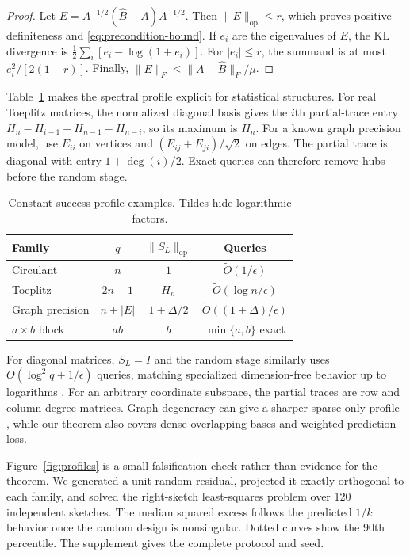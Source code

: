 \documentclass[twoside]{article}
\newcommand{\op}{\mathrm{op}}
\begin{document}
\begin{proof}
Let $E=A^{-1/2}(\widehat B-A)A^{-1/2}$. Then $\|E\|_\op\le r$, which proves positive definiteness and \eqref{eq:precondition-bound}. If $e_i$ are the eigenvalues of $E$, the KL divergence is $\frac12\sum_i[e_i-\log(1+e_i)]$. For $|e_i|\le r$, the summand is at most $e_i^2/[2(1-r)]$. Finally, $\|E\|_F\le\|A-\widehat B\|_F/\mu$.
\end{proof}

Table~\ref{tab:profiles} makes the spectral profile explicit for statistical structures. For real Toeplitz matrices, the normalized diagonal basis gives the $i$th partial-trace entry $H_n-H_{i-1}+H_{n-1}-H_{n-i}$, so its maximum is $H_n$. For a known graph precision model, use $E_{ii}$ on vertices and $(E_{ij}+E_{ji})/\sqrt2$ on edges. The partial trace is diagonal with entry $1+\deg(i)/2$. Exact queries can therefore remove hubs before the random stage.

\begin{table}[t]
\centering
\caption{Constant-success profile examples. Tildes hide logarithmic factors.}
\label{tab:profiles}
\small
\begin{tabular}{lccc}
\toprule
Family & $q$ & $\|S_L\|_\op$ & Queries \\
\midrule
Circulant & $n$ & $1$ & $\widetilde O(1/\epsilon)$ \\
Toeplitz & $2n-1$ & $H_n$ & $\widetilde O(\log n/\epsilon)$ \\
Graph precision & $n+|E|$ & $1+\Delta/2$ & $\widetilde O((1+\Delta)/\epsilon)$ \\
$a\times b$ block & $ab$ & $b$ & $\min\{a,b\}$ exact \\
\bottomrule
\end{tabular}
\end{table}

For diagonal matrices, $S_L=I$ and the random stage similarly uses $O(\log^2q+1/\epsilon)$ queries, matching specialized dimension-free behavior up to logarithms \citep{amsel2026fixed,dharangutte2023tight}. For an arbitrary coordinate subspace, the partial traces are row and column degree matrices. Graph degeneracy can give a sharper sparse-only profile \citep{musco2026instance}, while our theorem also covers dense overlapping bases and weighted prediction loss.

Figure~\ref{fig:profiles} is a small falsification check rather than evidence for the theorem. We generated a unit random residual, projected it exactly orthogonal to each family, and solved the right-sketch least-squares problem over 120 independent sketches. The median squared excess follows the predicted $1/k$ behavior once the random design is nonsingular. Dotted curves show the 90th percentile. The supplement gives the complete protocol and seed.
\end{document}

